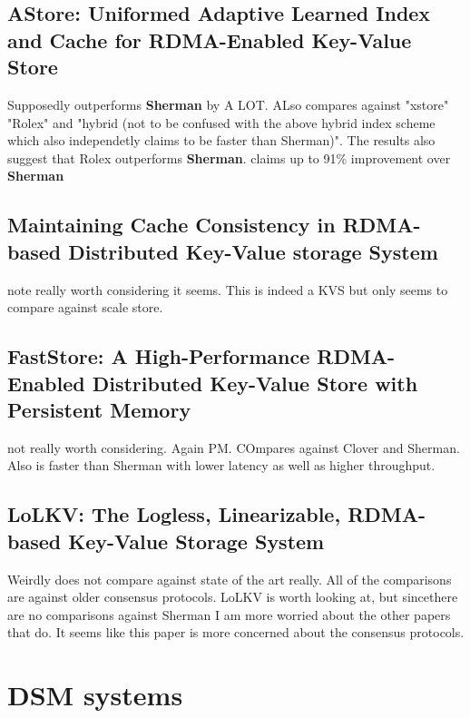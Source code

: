 \documentclass[sigplan,nonacm]{acmart}
\begin{document}
    \subsection{AStore: Uniformed Adaptive Learned Index and Cache for RDMA-Enabled Key-Value Store}
    Supposedly outperforms \textbf{Sherman} by A LOT. ALso compares against "xstore" "Rolex" and "hybrid (not to be confused
    with the above hybrid index scheme which also independetly claims to be faster than Sherman)". 
    The results also suggest that Rolex outperforms \textbf{Sherman}. claims up to 91\% improvement over \textbf{Sherman}\cite{Qiao-IEEEtrans-2024}

    \subsection{Maintaining Cache Consistency in RDMA-based Distributed Key-Value storage System}
    note really worth considering it seems. This is indeed a KVS but only seems to compare against scale store. \cite{Hou-DSIT-2024}

    \subsection{FastStore: A High-Performance RDMA-Enabled Distributed Key-Value Store with Persistent Memory}
    not really worth considering. Again PM. COmpares against Clover and Sherman. Also is faster than Sherman with lower latency 
    as well as higher throughput. \cite{Xiong-ICDCS-2023}

    \subsection{LoLKV: The Logless, Linearizable, RDMA-based Key-Value Storage System}
    Weirdly does not compare against state of the art really. All of the comparisons are against older consensus protocols.
    LoLKV is worth looking at, but sincethere are no comparisons against Sherman I am more worried about the other papers 
    that do. It seems like this paper is more concerned about the consensus protocols. \cite{Alquraan-NSDI-2024}
\section {DSM systems}
\end{document}
